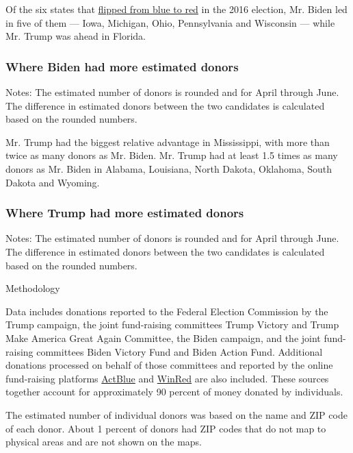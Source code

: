 Of the six states that
\href{https://www.nytimes.com/elections/2016/results/president}{flipped
from blue to red} in the 2016 election, Mr. Biden led in five of them
--- Iowa, Michigan, Ohio, Pennsylvania and Wisconsin --- while Mr. Trump
was ahead in Florida.

\hypertarget{where-biden-had-more-estimated-donors}{%
\subsubsection{Where Biden had more estimated
donors}\label{where-biden-had-more-estimated-donors}}

Notes: The estimated number of donors is rounded and for April through
June. The difference in estimated donors between the two candidates is
calculated based on the rounded numbers.

Mr. Trump had the biggest relative advantage in Mississippi, with more
than twice as many donors as Mr. Biden. Mr. Trump had at least 1.5 times
as many donors as Mr. Biden in Alabama, Louisiana, North Dakota,
Oklahoma, South Dakota and Wyoming.

\hypertarget{where-trump-had-more-estimated-donors}{%
\subsubsection{Where Trump had more estimated
donors}\label{where-trump-had-more-estimated-donors}}

Notes: The estimated number of donors is rounded and for April through
June. The difference in estimated donors between the two candidates is
calculated based on the rounded numbers.

Methodology

Data includes donations reported to the Federal Election Commission by
the Trump campaign, the joint fund-raising committees Trump Victory and
Trump Make America Great Again Committee, the Biden campaign, and the
joint fund-raising committees Biden Victory Fund and Biden Action Fund.
Additional donations processed on behalf of those committees and
reported by the online fund-raising platforms
\href{https://www.fec.gov/data/committee/C00401224/}{ActBlue} and
\href{https://www.fec.gov/data/committee/C00694323/}{WinRed} are also
included. These sources together account for approximately 90 percent of
money donated by individuals.

The estimated number of individual donors was based on the name and ZIP
code of each donor. About 1 percent of donors had ZIP codes that do not
map to physical areas and are not shown on the maps.

